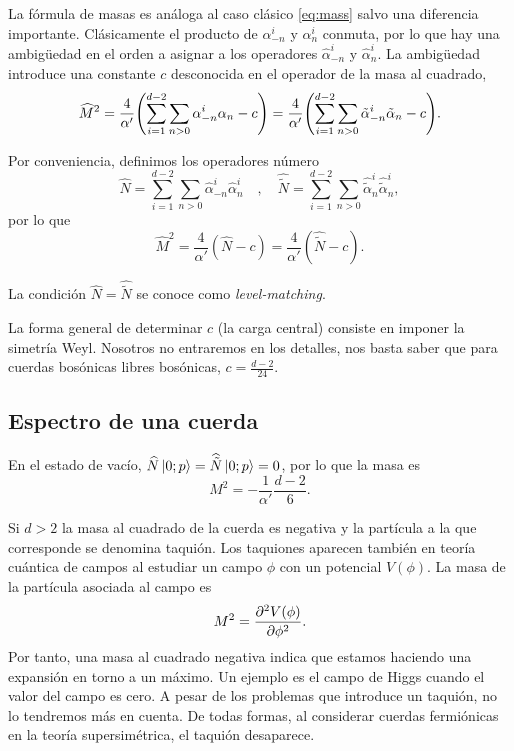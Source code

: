 La fórmula de masas es análoga al caso clásico \ref{eq:mass} salvo una diferencia importante.
Clásicamente el producto de $\alpha^i_{-n}$ y $\alpha^i_n$ conmuta, por lo que hay una 
ambigüedad en el orden a asignar a los operadores $\widehat\alpha^i_{-n}$ y $\widehat \alpha^i_n$.
La ambigüedad introduce una constante $c$ desconocida en el operador de la masa al cuadrado,
\begin{equation}
  \widehat M^2 = \frac{4}{\alpha'}\qty(\sum_{i=1}^{d-2} \sum_{n>0} \alpha_{-n}^i\alpha_n -c)
   = \frac{4}{\alpha'}\qty(\sum_{i=1}^{d-2} \sum_{n>0} \tilde \alpha_{-n}^i\tilde \alpha_n -c).
\end{equation}

Por conveniencia, definimos los operadores número
\begin{equation}
  \widehat N=\sum_{i=1}^{d-2} \sum_{n>0}\widehat \alpha_{-n}^i\widehat\alpha_n^i \quad , \quad   
  \widehat {\tilde N}=\sum_{i=1}^{d-2} \sum_{n>0} \widehat{\tilde \alpha}_n^i\widehat{ \tilde\alpha}_n^i, 
\end{equation}
por lo que 
\begin{equation}
  \widehat M^2 = \frac{4}{\alpha'} (\widehat N -c ) = \frac{4}{\alpha'} (\widehat{\tilde N} -c).
\end{equation}

La condición $\widehat N=\widehat {\tilde N}$ se conoce como \emph{level-matching}.

La forma general de determinar $c$ (la carga central) consiste en imponer la simetría Weyl.
Nosotros no entraremos en los detalles, nos basta saber que para cuerdas bosónicas libres
bosónicas, $c=\frac{d-2}{24}$.


\subsection{Espectro de una cuerda}
En el estado de vacío, $\widehat N\ket{0;p}=\widehat {\tilde N}\ket{0;p}=0$, por lo que la masa es
\begin{equation}
  M^2 = -\frac{1}{\alpha'}\frac{d-2}{6}.
\end{equation}

Si $d>2$ la masa al cuadrado de la cuerda es negativa y la partícula a la que corresponde se denomina taquión.
Los taquiones aparecen también en teoría cuántica de campos al estudiar un campo $\phi$ con un 
potencial $V(\phi)$.
La masa de la partícula asociada al campo es
\begin{equation}
  M^2 = \pdv[2]{V(\phi)}{\phi}.
\end{equation}
Por tanto, una masa al cuadrado negativa indica que estamos haciendo una expansión en torno
a un máximo. 
Un ejemplo es el campo de Higgs cuando el valor del campo es cero.
A pesar de los problemas que introduce un taquión, no lo tendremos más en cuenta. 
De todas formas, al considerar cuerdas fermiónicas en la teoría supersimétrica, el taquión
desaparece.

